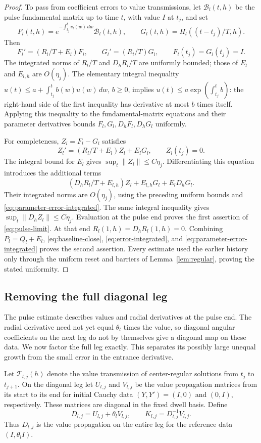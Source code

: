 \begin{proof}
To pass from coefficient errors to value transmissions, let
\(\mathcal B_l(t,h)\) be the pulse fundamental matrix up to time
\(t\), with value \(I\) at \(t_j\), and set
\[
 F_l(t,h)=
 e^{-\int_{t_j}^t v_l(w)\,dw}\mathcal B_l(t,h),\qquad
 G_l(t,h)=H_l((t-t_j)/T,h).
\]
Then
\[
 F_l'=(R_l/T+E_l)F_l,\qquad
 G_l'=(R_l/T)G_l,\qquad F_l(t_j)=G_l(t_j)=I.
\]
The integrated norms of \(R_l/T\) and \(D_hR_l/T\) are uniformly
bounded; those of \(E_l\) and \(E_{l,h}\) are \(O(\eta_j)\).
The elementary integral inequality
\(u(t)\leq a+\int_{t_j}^t b(w)u(w)\,dw\), \(b\geq0\), implies
\(u(t)\leq a\exp(\int_{t_j}^t b)\): the right-hand side of the
first inequality has derivative at most \(b\) times itself.
Applying this inequality to the fundamental-matrix equations and
their parameter derivatives bounds
\(F_l,G_l,D_hF_l,D_hG_l\) uniformly.

For completeness, \(Z_l=F_l-G_l\) satisfies
\[
 Z_l'=(R_l/T+E_l)Z_l+E_lG_l,\qquad Z_l(t_j)=0.
\]
The integral bound for \(E_l\) gives
\(\sup_t\|Z_l\|\leq C\eta_j\).  Differentiating this equation
introduces the additional terms
\[
 (D_hR_l/T+E_{l,h})Z_l+E_{l,h}G_l+E_lD_hG_l.
\]
Their integrated norms are \(O(\eta_j)\), using the preceding
uniform bounds and \eqref{eq:parameter-error-integrated}.
The same integral inequality gives
\(\sup_t\|D_hZ_l\|\leq C\eta_j\).  Evaluation at the pulse end
proves the first assertion of \eqref{eq:pulse-limit}.
At that end \(R_l(1,h)=D_hR_l(1,h)=0\).  Combining
\(P_l=Q_l+E_l\), \eqref{eq:baseline-close},
\eqref{eq:error-integrated}, and
\eqref{eq:parameter-error-integrated} proves the second assertion.
Every estimate used the earlier history only through the uniform
reset and barriers of Lemma~\ref{lem:regular}, proving the stated
uniformity.
\end{proof}

\subsection{Removing the full diagonal leg}
\label{subsec:leg}

The pulse estimate describes values and radial derivatives at
the pulse end.  The radial derivative need not yet equal
\(\theta_l\) times the value, so diagonal angular coefficients
on the next leg do not by themselves give a diagonal map on
these data.  We now factor the full leg exactly.  This separates
its possibly large unequal growth from the small error in the
entrance derivative.

Let \(\mathcal T_{l,j}(h)\) denote the value transmission of
center-regular solutions from \(t_j\) to \(t_{j+1}\).  On the
diagonal leg let \(U_{l,j}\) and \(V_{l,j}\) be the value
propagation matrices from its start to its end for initial
Cauchy data \((Y,Y')=(I,0)\) and \((0,I)\), respectively.  These
matrices are diagonal in the fixed dwell basis.  Define
\begin{equation}
 D_{l,j}=U_{l,j}+\theta_lV_{l,j},\qquad
 K_{l,j}=D_{l,j}^{-1}V_{l,j}.
 \label{eq:diagonal-reference}
\end{equation}
Thus \(D_{l,j}\) is the value propagation on the entire leg for
the reference data \((I,\theta_l I)\).

